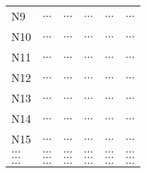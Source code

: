 \documentclass[12pt]{article}
\begin{document}
\begin{enumerate}
\begin{table}[h!]
\begin{tabular}{p{1in}p{1in}p{1in}p{1in}p{1in}p{1in}}
N9 & $\dots$ & $\dots$& $\dots$&$\dots$& $\dots$ \\
N10 & $\dots$ & $\dots$& $\dots$&$\dots$& $\dots$ \\
N11 & $\dots$ & $\dots$& $\dots$&$\dots$& $\dots$ \\
N12 & $\dots$ & $\dots$& $\dots$&$\dots$& $\dots$ \\
N13 & $\dots$ & $\dots$& $\dots$&$\dots$& $\dots$ \\
N14 & $\dots$ & $\dots$& $\dots$&$\dots$& $\dots$ \\
N15 & $\dots$ & $\dots$& $\dots$&$\dots$& $\dots$ \\
$\dots$ & $\dots$ & $\dots$& $\dots$&$\dots$& $\dots$ \\
$\dots$ & $\dots$ & $\dots$& $\dots$&$\dots$& $\dots$ \\
$\dots$ & $\dots$ & $\dots$& $\dots$&$\dots$& $\dots$ \\

\end{tabular}
\end{table}
\end{enumerate}
\end{document}
